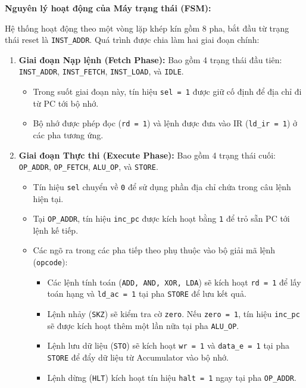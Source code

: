 \textbf{Nguyên lý hoạt động của Máy trạng thái (FSM):}

Hệ thống hoạt động theo một vòng lặp khép kín gồm 8 pha, 
bắt đầu từ trạng thái reset là \texttt{INST\_ADDR}. Quá trình được chia làm hai giai đoạn chính:

\begin{enumerate}
    \item \textbf{Giai đoạn Nạp lệnh (Fetch Phase):} Bao gồm 4 trạng thái đầu tiên: \texttt{INST\_ADDR}, \texttt{INST\_FETCH}, \texttt{INST\_LOAD}, và \texttt{IDLE}. 
    \begin{itemize}
        \item Trong suốt giai đoạn này, tín hiệu \texttt{sel = 1} được giữ cố định để địa chỉ đi từ PC tới bộ nhớ.
        \item Bộ nhớ được phép đọc (\texttt{rd = 1}) và lệnh được đưa vào IR (\texttt{ld\_ir = 1}) ở các pha tương ứng.
    \end{itemize}
    
    \item \textbf{Giai đoạn Thực thi (Execute Phase):} Bao gồm 4 trạng thái cuối: \texttt{OP\_ADDR}, \texttt{OP\_FETCH}, \texttt{ALU\_OP}, và \texttt{STORE}.
    \begin{itemize}
        \item Tín hiệu \texttt{sel} chuyển về \texttt{0} để sử dụng phần địa chỉ chứa trong câu lệnh hiện tại.
        \item Tại \texttt{OP\_ADDR}, tín hiệu \texttt{inc\_pc} được kích hoạt bằng \texttt{1} để trỏ sẵn PC tới lệnh kế tiếp.
        \item Các ngõ ra trong các pha tiếp theo phụ thuộc vào bộ giải mã lệnh (\texttt{opcode}):
        \begin{itemize}
            \item Các lệnh tính toán (\texttt{ADD, AND, XOR, LDA}) sẽ kích hoạt \texttt{rd = 1} để lấy toán hạng và \texttt{ld\_ac = 1} tại pha \texttt{STORE} để lưu kết quả.
            \item Lệnh nhảy (\texttt{SKZ}) sẽ kiểm tra cờ \texttt{zero}. Nếu \texttt{zero = 1}, 
            tín hiệu \texttt{inc\_pc} sẽ được kích hoạt thêm một lần nữa tại pha \texttt{ALU\_OP}.
            \item Lệnh lưu dữ liệu (\texttt{STO}) sẽ kích hoạt \texttt{wr = 1} và \texttt{data\_e = 1} tại pha \texttt{STORE} để đẩy dữ liệu từ Accumulator vào bộ nhớ.
            \item Lệnh dừng (\texttt{HLT}) kích hoạt tín hiệu \texttt{halt = 1} ngay tại pha \texttt{OP\_ADDR}.
        \end{itemize}
    \end{itemize}
\end{enumerate}